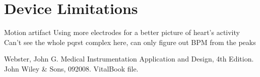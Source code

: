 \documentclass[pdftex,12pt,letterpaper]{article}
\begin{document}
\section{Device Limitations}

Motion artifact
Using more electrodes for a better picture of heart's activity
Can't see the whole pqrst complex here, can only figure out BPM from the peaks

\begin{thebibliography}{1}

Webster, John G. Medical Instrumentation Application and Design, 4th Edition. John Wiley \& Sons, 092008. VitalBook file.

\end{thebibliography}
\end{document}
